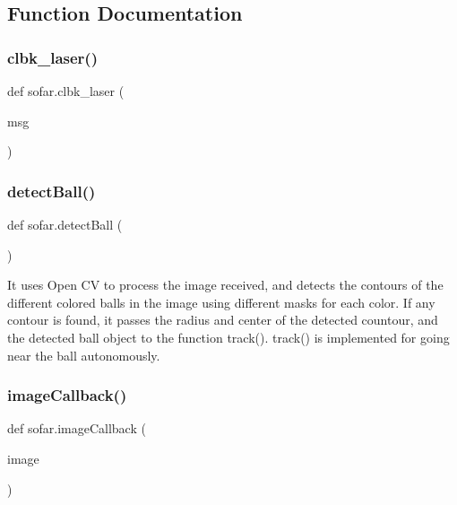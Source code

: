 \subsection{Function Documentation}
\mbox{\label{namespacesofar_a825650ee1ca10b1211d10f7129f71d7c}} 
\subsubsection{\texorpdfstring{clbk\+\_\+laser()}{clbk\_laser()}}
{\footnotesize\ttfamily def sofar.\+clbk\+\_\+laser (\begin{DoxyParamCaption}\item[{}]{msg }\end{DoxyParamCaption})}

\mbox{\label{namespacesofar_ab7831b2945a1bd5fb2868bfb1a9a1119}} 
\subsubsection{\texorpdfstring{detect\+Ball()}{detectBall()}}
{\footnotesize\ttfamily def sofar.\+detect\+Ball (\begin{DoxyParamCaption}{ }\end{DoxyParamCaption})}

\begin{DoxyVerb}    It uses Open CV to process the image received, and detects the contours of the different colored balls in the image using different masks for each color. 
    If any contour is found, it passes the radius and center of the detected countour, and the detected ball object to the function track(). track() is implemented for going near the ball autonomously.  \end{DoxyVerb}
 \mbox{\label{namespacesofar_ad92d3e60778d7b31fa72a235856fb583}} 
\subsubsection{\texorpdfstring{image\+Callback()}{imageCallback()}}
{\footnotesize\ttfamily def sofar.\+image\+Callback (\begin{DoxyParamCaption}\item[{}]{image }\end{DoxyParamCaption})}

